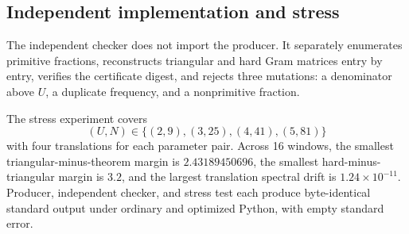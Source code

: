\subsection{Independent implementation and stress}

The independent checker does not import the producer.  It separately
enumerates primitive fractions, reconstructs triangular and hard Gram
matrices entry by entry, verifies the certificate digest, and rejects three
mutations: a denominator above \(U\), a duplicate frequency, and a
nonprimitive fraction.

The stress experiment covers
\[
(U,N)\in\{(2,9),(3,25),(4,41),(5,81)\}
\]
with four translations for each parameter pair.  Across 16 windows, the
smallest triangular-minus-theorem margin is \(2.43189450696\), the smallest
hard-minus-triangular margin is \(3.2\), and the largest translation spectral
drift is \(1.24\times10^{-11}\).  Producer, independent checker, and stress
test each produce byte-identical standard output under ordinary and optimized
Python, with empty standard error.
